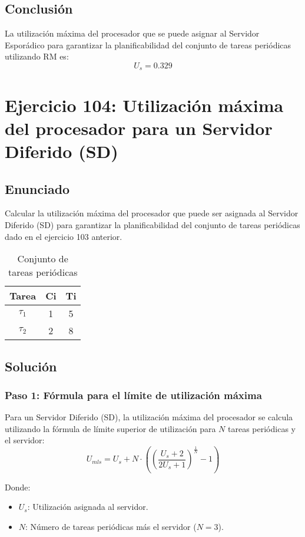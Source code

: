 \documentclass[a4paper,12pt]{article}
\begin{document}
\subsection{Conclusión}
La utilización máxima del procesador que se puede asignar al Servidor Esporádico para garantizar la planificabilidad del conjunto de tareas periódicas utilizando RM es:
\[
\boxed{U_s = 0.329}
\]
\section{Ejercicio 104: Utilización máxima del procesador para un Servidor Diferido (SD)}
\subsection{Enunciado}
Calcular la utilización máxima del procesador que puede ser asignada al Servidor Diferido (SD) para garantizar la planificabilidad del conjunto de tareas periódicas dado en el ejercicio 103 anterior.

\begin{table}[H]
\centering
\begin{tabular}{|c|c|c|}
\hline
\textbf{Tarea} & \textbf{Ci} & \textbf{Ti} \\ \hline
$\tau_1$ & 1 & 5 \\ \hline
$\tau_2$ & 2 & 8 \\ \hline
\end{tabular}
\caption{Conjunto de tareas periódicas}
\end{table}

\subsection{Solución}
\subsubsection{Paso 1: Fórmula para el límite de utilización máxima}
Para un Servidor Diferido (SD), la utilización máxima del procesador se calcula utilizando la fórmula de límite superior de utilización para \(N\) tareas periódicas y el servidor:
\[
U_{mls} = U_s + N \cdot \left( \left( \frac{U_s + 2}{2U_s + 1} \right)^{\frac{1}{N}} - 1 \right)
\]

Donde:
\begin{itemize}
    \item \(U_s\): Utilización asignada al servidor.
    \item \(N\): Número de tareas periódicas más el servidor (\(N = 3\)).
\end{itemize}
\end{document}
